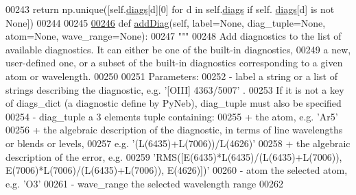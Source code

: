 \begin{DoxyCode}
00243         \textcolor{keywordflow}{return} np.unique([self.\hyperlink{classpyneb_1_1core_1_1diags_1_1_diagnostics_a0c0f7e36097677f61a6a14a0c3127b02}{diags}[d][0] \textcolor{keywordflow}{for} d \textcolor{keywordflow}{in} self.\hyperlink{classpyneb_1_1core_1_1diags_1_1_diagnostics_a0c0f7e36097677f61a6a14a0c3127b02}{diags} \textcolor{keywordflow}{if} self.
      \hyperlink{classpyneb_1_1core_1_1diags_1_1_diagnostics_a0c0f7e36097677f61a6a14a0c3127b02}{diags}[d] \textcolor{keywordflow}{is} \textcolor{keywordflow}{not} \textcolor{keywordtype}{None}])
00244     
00245     
\hypertarget{diags_8py_source_l00246}{}\hyperlink{classpyneb_1_1core_1_1diags_1_1_diagnostics_a508fa9c5a2216f9eb4128338c33a6f75}{00246}     \textcolor{keyword}{def }\hyperlink{classpyneb_1_1core_1_1diags_1_1_diagnostics_a508fa9c5a2216f9eb4128338c33a6f75}{addDiag}(self, label=None, diag\_tuple=None, atom=None, wave\_range=None):
00247         \textcolor{stringliteral}{"""}
00248 \textcolor{stringliteral}{        Add diagnostics to the list of available diagnostics. It can either be one of the built-in
       diagnostics,}
00249 \textcolor{stringliteral}{        a new, user-defined one, or a subset of the built-in diagnostics corresponding to a given atom or
       wavelength.}
00250 \textcolor{stringliteral}{        }
00251 \textcolor{stringliteral}{        Parameters:}
00252 \textcolor{stringliteral}{            - label        a string or a list of strings describing the diagnostic, e.g. '[OIII] 4363/5007'
      . }
00253 \textcolor{stringliteral}{                           If it is not a key of diags\_dict (a diagnostic define by PyNeb), diag\_tuple must
       also be specified}
00254 \textcolor{stringliteral}{            - diag\_tuple   a 3 elements tuple containing:}
00255 \textcolor{stringliteral}{                           + the atom, e.g. 'Ar5'}
00256 \textcolor{stringliteral}{                           + the algebraic description of the diagnostic, in terms of line wavelengths or
       blends or levels, }
00257 \textcolor{stringliteral}{                             e.g. '(L(6435)+L(7006))/L(4626)'}
00258 \textcolor{stringliteral}{                           + the algebraic description of the error, e.g. }
00259 \textcolor{stringliteral}{                             'RMS([E(6435)*L(6435)/(L(6435)+L(7006)), E(7006)*L(7006)/(L(6435)+L(7006)),
       E(4626)])'}
00260 \textcolor{stringliteral}{            - atom         the selected atom, e.g. 'O3'}
00261 \textcolor{stringliteral}{            - wave\_range   the selected wavelength range}
00262 \textcolor{stringliteral}{            }

\end{DoxyCode}
